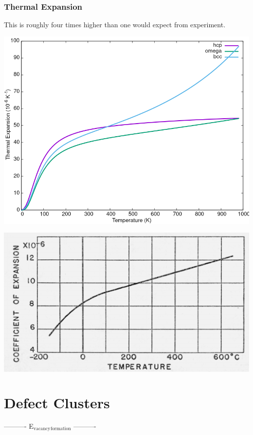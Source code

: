 \documentclass[11pt]{article}
\begin{document}
\subsubsection{Thermal Expansion}
\label{sec:org1c4b190}

This is roughly four times higher than one would expect from
experiment. 
\begin{center}
\includegraphics[width=.9\linewidth]{Images/thermal_expansion_all_phases_2020-04-02.png}
\end{center}

\begin{center}
\includegraphics[width=.9\linewidth]{Images/thermal_expansion_alpha_ti_exp.png}
\end{center}

\section{Defect Clusters}
\label{sec:org41041a6}

----------     E\(_{\text{vacancy}}\)\(_{\text{formation}}\)     ----------
\end{document}
